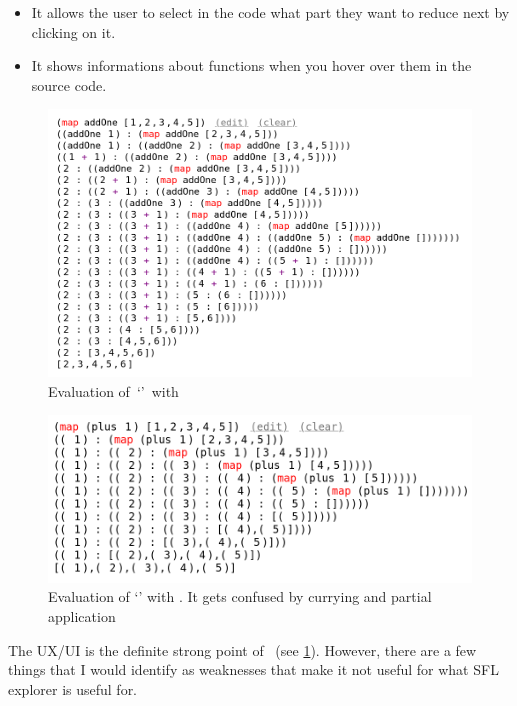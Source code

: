 \begin{itemize}
    \item It allows the user to select in the code what part they want to reduce next by clicking on it. 
    \item It shows informations about functions when you hover over them in the source code. 
\end{itemize}


\begin{figure}[t]
    \centering
    \includegraphics[width=0.75\linewidth]{images/LLessonsMap.png}
    \caption{Evaluation of\ `'\ with \llessons}
    \label{bg:llessons_ui}
\end{figure}

\begin{figure}[t]
    \centering
    \includegraphics[width=0.75\linewidth]{images/LLessonsGoingWrong.png}
    \caption{Evaluation of `' with \llessons. It gets confused by currying and partial application}
    \label{bg:llessons_gets_confused}
\end{figure}

The UX/UI is the definite strong point of \llessons\ (see \ref{bg:llessons_ui}).  However, there are a few things that I would identify as weaknesses that make it not useful for what SFL explorer is useful for.

